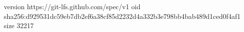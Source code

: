 version https://git-lfs.github.com/spec/v1
oid sha256:d929531dc59eb7db2ef6a38cf85d2232d4a332b3e798bb4bab489d1ced0f4af1
size 32217
